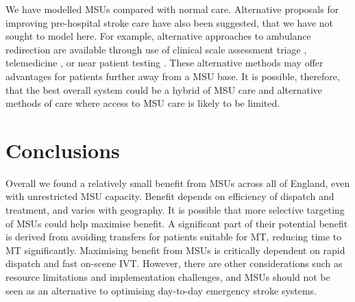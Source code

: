 We have modelled MSUs compared with normal care. Alternative proposals for improving pre-hospital stroke care have also been suggested, that we have not sought to model here. For example, alternative approaches to ambulance redirection are available through use of clinical scale assessment triage \cite{dekker_prehospital_2025}, telemedicine \cite{sarpourian_application_2023}, or near patient testing \cite{shaw_rapid_2024}. These alternative methods may offer advantages for patients further away from a MSU base. It is possible, therefore, that the best overall system could be a hybrid of MSU care and alternative methods of care where access to MSU care is likely to be limited.

\section{Conclusions}

Overall we found a relatively small benefit from MSUs across all of England, even with unrestricted MSU capacity. Benefit depends on efficiency of dispatch and treatment, and varies with geography. It is possible that more selective targeting of MSUs could help maximise benefit. A significant part of their potential benefit is derived from avoiding transfers for patients suitable for MT, reducing time to MT significantly. Maximising benefit from MSUs is critically dependent on rapid dispatch and fast on-scene IVT. However, there are other considerations such as resource limitations and implementation challenges, and MSUs should not be seen as an alternative to optimising day-to-day emergency stroke systems.